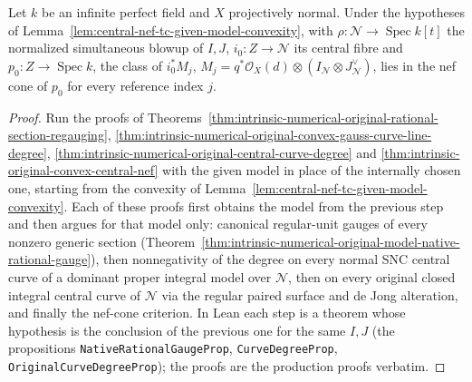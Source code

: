 \begin{theorem}
\label{thm:central-nef-tc-given-model}
\leanok
{}
Let $k$ be an infinite perfect field and $X$ projectively normal.  Under the
hypotheses of Lemma~\ref{lem:central-nef-tc-given-model-convexity}, with
$\rho:\mathcal N\to\operatorname{Spec}k[t]$ the normalized simultaneous
blowup of $I,J$, $i_0:Z\to\mathcal N$ its central fibre and
$p_0:Z\to\operatorname{Spec}k$, the class of $i_0^*M_j$,
$M_j=q^*\mathcal O_X(d)\otimes(I_{\mathcal N}\otimes J_{\mathcal N}^\vee)$,
lies in the nef cone of $p_0$ for every reference index $j$.
\end{theorem}
\begin{proof}
Run the proofs of
Theorems~\ref{thm:intrinsic-numerical-original-rational-section-regauging},
\ref{thm:intrinsic-numerical-original-convex-gauss-curve-line-degree},
\ref{thm:intrinsic-numerical-original-central-curve-degree} and
\ref{thm:intrinsic-original-convex-central-nef} with the given model in place
of the internally chosen one, starting from the convexity of
Lemma~\ref{lem:central-nef-tc-given-model-convexity}.  Each of these proofs
first obtains the model from the previous step and then argues for that
model only: canonical regular-unit gauges of every nonzero generic section
(Theorem~\ref{thm:intrinsic-numerical-original-model-native-rational-gauge}),
then nonnegativity of the degree on every normal SNC central curve of a
dominant proper integral model over $\mathcal N$, then on every original
closed integral central curve of $\mathcal N$ via the regular paired surface
and de Jong alteration, and finally the nef-cone criterion.  In Lean each
step is a theorem whose hypothesis is the conclusion of the previous one for
the same $I,J$ (the propositions \texttt{NativeRationalGaugeProp},
\texttt{CurveDegreeProp}, \texttt{OriginalCurveDegreeProp}); the proofs are
the production proofs verbatim.
\end{proof}

